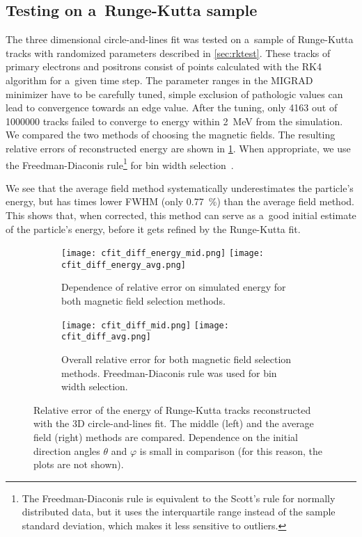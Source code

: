 			\subsection{Testing on a~Runge-Kutta sample}
				The three dimensional circle-and-lines fit was tested on a~sample of Runge-Kutta tracks with randomized parameters described in \cref{sec:rktest}. These tracks of primary electrons and positrons consist of points calculated with the \ac{RK4} algorithm for a~given time step. The parameter ranges in the MIGRAD minimizer have to be carefully tuned, simple exclusion of pathologic values can lead to convergence towards an edge value. After the tuning, only \num{4163} out of \num{1000000} tracks failed to converge to energy within \qty{2}{\MeV} from the simulation. We compared the two methods of choosing the magnetic fields. The resulting relative errors of reconstructed energy are shown in \cref{fig:cfit_rk}. When appropriate, we use the Freedman-Diaconis rule\footnote{The Freedman-Diaconis rule is equivalent to the Scott's rule for normally distributed data, but it uses the interquartile range instead of the sample standard deviation, which makes it less sensitive to outliers.} for bin width selection~\cite{FreedmanDiac}.

				We see that the average field method systematically underestimates the particle's energy, but has  times lower \acs{FWHM} (only \qty{0.77}{\percent}) than the average field method. This shows that, when corrected, this method can serve as a~good initial estimate of the particle's energy, before it gets refined by the Runge-Kutta fit.
				
				\begin{figure}
					\centering
					\begin{subfigure}[t]{\textwidth}
						\centering
						\texttt{[image: cfit\_diff\_energy\_mid.png]}
						\hfill
						\texttt{[image: cfit\_diff\_energy\_avg.png]}
						\caption{Dependence of relative error on simulated energy for both magnetic field selection methods.}
					\end{subfigure}
					\begin{subfigure}[t]{\textwidth}
						\centering
						\texttt{[image: cfit\_diff\_mid.png]}
						\hfill
						\texttt{[image: cfit\_diff\_avg.png]}
						\caption{Overall relative error for both magnetic field selection methods. Freedman-Diaconis rule was used for bin width selection.}
					\end{subfigure}
					\caption{Relative error of the energy of Runge-Kutta tracks reconstructed with the 3D circle-and-lines fit. The middle (left) and the average field (right) methods are compared. Dependence on the initial direction angles $\theta$ and $\varphi$ is small in comparison (for this reason, the plots are not shown).}
					\label{fig:cfit_rk}
				\end{figure}
	
